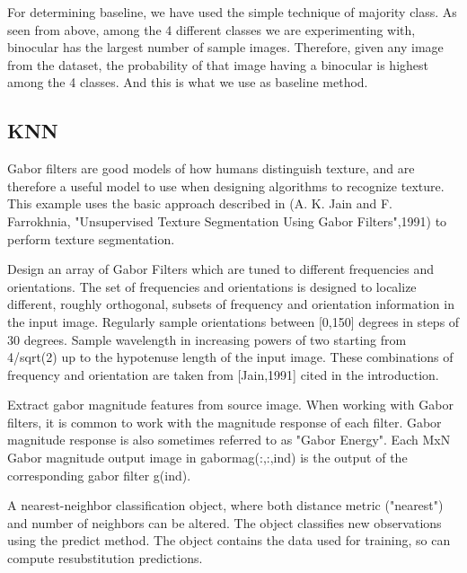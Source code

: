 \documentclass{article} %
\begin{document}
For determining baseline, we have used the simple technique of majority class. As seen from above, among the 4 different classes we are experimenting with, binocular has the largest number of sample images. Therefore, given any image from the dataset, the probability of that image having a binocular is highest among the 4 classes. And this is what we use as baseline method.

\subsection{KNN}

Gabor filters are good models of how humans distinguish texture, and are therefore a useful model to use when designing algorithms to recognize texture. This example uses the basic approach described in (A. K. Jain and F. Farrokhnia, "Unsupervised Texture Segmentation Using Gabor Filters",1991) to perform texture segmentation.\cite{Mathworks}

Design an array of Gabor Filters which are tuned to different frequencies and orientations. The set of frequencies and orientations is designed to localize different, roughly orthogonal, subsets of frequency and orientation information in the input image. Regularly sample orientations between [0,150] degrees in steps of 30 degrees. Sample wavelength in increasing powers of two starting from 4/sqrt(2) up to the hypotenuse length of the input image. These combinations of frequency and orientation are taken from [Jain,1991] cited in the introduction.\cite{Mathworks}

Extract gabor magnitude features from source image. When working with Gabor filters, it is common to work with the magnitude response of each filter. Gabor magnitude response is also sometimes referred to as "Gabor Energy". Each MxN Gabor magnitude output image in gabormag(:,:,ind) is the output of the corresponding gabor filter g(ind).\cite{Mathworks}

A nearest-neighbor classification object, where both distance metric ("nearest") and number of neighbors can be altered. The object classifies new observations using the predict method. The object contains the data used for training, so can compute resubstitution predictions.
\end{document}
